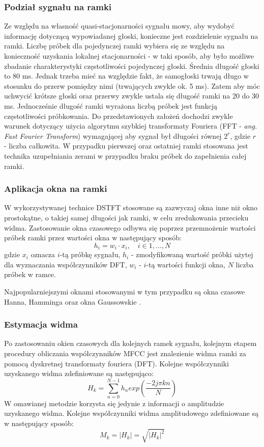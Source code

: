 \subsubsection{Podział sygnału na ramki}
Ze względu na własność quasi-stacjonarności sygnału mowy, aby wydobyć informację dotyczącą wypowiadanej głoski, konieczne jest rozdzielenie sygnału na ramki.
Liczbę próbek dla pojedynczej ramki wybiera się ze względu na konieczność uzyskania lokalnej stacjonarności - w taki sposób, aby było możliwe zbadanie charakterystyki częstotliwości pojedynczej głoski. Średnia długość głoski to 80 ms. Jednak trzeba mieć na względzie fakt, że samogłoski trwają długo w stosunku do przerw pomiędzy nimi (trwających zwykle ok. 5 ms). Zatem aby móc uchwycić krótsze głoski oraz przerwy zwykle ustala się długość ramki na 20 do 30 ms. Jednocześnie długość ramki wyrażona liczbą próbek jest funkcją częstotliwości próbkowania. Do przedstawionych założeń dochodzi zwykle warunek dotyczący użycia algorytmu szybkiej transformaty Fouriera (FFT - \textit{ang. Fast Fourier Transform}) wymagającej aby sygnał był długości równej $2^r$, gdzie $r$ - liczba całkowita. W przypadku pierwszej oraz ostatniej ramki stosowana jest technika uzupełniania zerami w przypadku braku próbek do zapełnienia całej ramki.

\subsubsection{Aplikacja okna na ramki}
W wykorzystywanej technice DSTFT stosowane są zazwyczaj okna inne niż okno prostokątne, o takiej samej długości jak ramki, w celu zredukowania przecieku widma. Zastosowanie okna czasowego odbywa się poprzez przemnożenie wartości próbek ramki przez wartości okna w następujący sposób:
\begin{equation}
  h_i = w_i \cdot x_i, \quad i \in {1,...,N}
\end{equation}
gdzie $x_i$ oznacza $i$-tą próbkę sygnału, $h_i$ - zmodyfikowaną wartość próbki użytej dla wyznaczania współczynników DFT, $w_i$ - $i$-tą wartości funkcji okna, $N$ liczba próbek w ramce. 

Najpopularniejszymi oknami stosowanymi w tym przypadku są okna czasowe Hanna, Hamminga oraz okna Gaussowskie \cite{fosr}.

\subsubsection{Estymacja widma}
\label{stft}
Po zastosowaniu okien czasowych dla kolejnych ramek sygnału, kolejnym etapem procedury obliczania współczynników MFCC jest znalezienie widma ramki za pomocą dyskretnej transformaty fouriera (DFT). Kolejne współczynniki uzyskanego widma zdefiniowane są następująco:
\begin{equation}
  H_k = \sum^{N-1}_{n=0} h_n exp\left(\frac{-2j\pi kn}{N} \right)
\end{equation}
W omawianej metodzie korzysta się jedynie z informacji o amplitudzie uzyskanego widma. Kolejne współczynniki widma amplitudowego zdefiniowane są w następujący sposób:
\begin{equation}
  M_k = |H_k| = \sqrt{|H_k|^2}
\end{equation}

